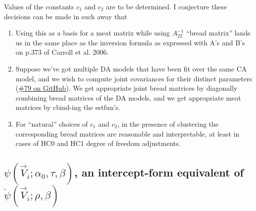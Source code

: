 \documentclass{article}
\begin{document}
Values of the constants $c_{1}$ and $c_{2}$ are to be determined.
I conjecture these decisions can be made in such away that
\begin{enumerate}
\item Using this as a basis for a meat matrix while using
  $A_{22}^{-1}$  ``bread matrix'' lands us in the same place as the
  inversion formula as expressed with A's and B's on p.373 of Carroll
  et al. 2006.
\item Suppose we've got multiple DA models that have been fit over the
  same CA model, and we wish to compute joint covariances for their
  distinct parameters
  (\href{https://github.com/benbhansen-stats/propertee/issues/79}{\#79
    on GitHub}). We get appropriate joint bread matrices by
  diagonally combining bread matrices of the DA models, and we get
  appropriate meat matrices by cbind-ing the estfun's.
\item For ``natural'' choices of $c_{1}$ and $c_{2}$, in the
  presence of clustering the corresponding bread matrices are
  reasonable and interpretable, at least in cases of HC0 and HC1
  degree of freedom adjustments.
\end{enumerate}

\subsection{$\psi(\vec{V}_{i};
  \alpha_{0}, \tau, \beta)$, an intercept-form equivalent of $\grave{\psi}(\vec{V}_{i};
  \rho, \beta)$}
\label{sec:psit-rho_0-tau}
\end{document}
